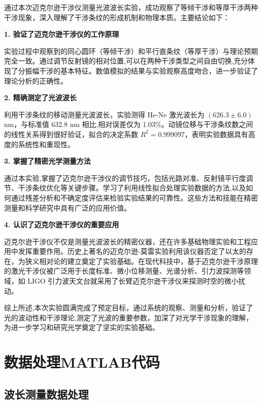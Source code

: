 ﻿\documentclass[12pt,a4paper]{article}
\begin{document}
通过本次迈克尔逊干涉仪测量光波波长实验，成功观察了等倾干涉和等厚干涉两种干涉现象，深入理解了干涉条纹的形成机制和物理本质。主要结论如下：

\textbf{1. 验证了迈克尔逊干涉仪的工作原理}

实验过程中观察到的同心圆环（等倾干涉）和平行直条纹（等厚干涉）与理论预期完全一致。通过调节反射镜的相对位置,可以在两种干涉类型之间自由切换,充分体现了分振幅干涉的基本特征。数值模拟的结果与实验观察高度吻合，进一步验证了理论分析的正确性。

\textbf{2. 精确测定了光波波长}

利用干涉条纹的移动测量光波波长，实验测得 He-Ne 激光波长为 $(626.3 \pm 6.0)$ nm，与标准值 632.8 nm 相比,相对误差仅为 1.03\%。动镜位移与干涉条纹数之间的线性关系得到很好验证，拟合的决定系数 $R^2 = 0.999097$，表明实验数据具有高度的系统性和重现性。

\textbf{3. 掌握了精密光学测量方法}

通过本实验,掌握了迈克尔逊干涉仪的调节技巧，包括光路对准、反射镜平行度调节、干涉条纹优化等关键步骤。学习了利用线性拟合处理实验数据的方法,以及如何通过残差分析和不确定度评估来检验实验结果的可靠性。这些方法和技能在精密测量和科学研究中具有广泛的应用价值。

\textbf{4. 认识了迈克尔逊干涉仪的重要应用}

迈克尔逊干涉仪不仅是测量光波波长的精密仪器，还在许多基础物理实验和工程应用中发挥重要作用。历史上著名的迈克尔逊-莫雷实验利用该仪器否定了以太的存在，为狭义相对论的建立奠定了实验基础。在现代科技中，基于迈克尔逊干涉原理的激光干涉仪被广泛用于长度标准、微小位移测量、光谱分析、引力波探测等领域，如 LIGO 引力波天文台就采用了长臂迈克尔逊干涉仪来探测时空的微小扰动。

综上所述,本次实验圆满完成了预定目标，通过系统的观察、测量和分析，验证了光的波动性和干涉理论,测定了光波的重要参数，加深了对光学干涉现象的理解，为进一步学习和研究光学奠定了坚实的实验基础。

\clearpage
\appendix

\section{数据处理MATLAB代码}

\subsection{波长测量数据处理}
\end{document}
